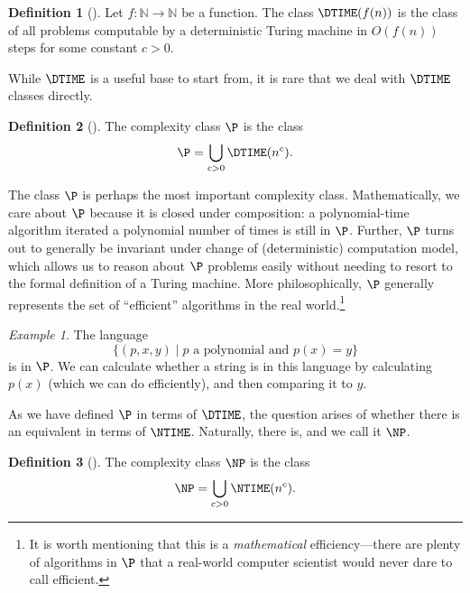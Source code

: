 \documentclass[english,12pt]{reedthesis}
\theoremstyle{plain}
\theoremstyle{definition}
\newtheorem{defn}[defn]{Definition}
\theoremstyle{remark}
\newtheorem{example}{Example}[thm]
\begin{document}
\begin{defn}[{\cite[Def.\ 1.19]{AB09}}]\label{def:dtime}
  Let $f: \mathbb{N} \rightarrow \mathbb{N}$ be a function. The class $\DTIME(f(n))$ is the class of all
  problems computable by a deterministic Turing machine in $O(f(n))$ steps for
  some constant $c > 0$.
\end{defn}

While $\DTIME$ is a useful base to start from, it is rare that we deal with
$\DTIME$ classes directly. %

\begin{defn}[{\cite[Def.\ 1.20]{AB09}}]\label{def:p}
  The complexity class $\P$ is the class
  \[
    \P = \bigcup_{c > 0}\DTIME(n^{c}).
  \]
\end{defn}

The class $\P$ is perhaps the most important complexity class. Mathematically,
we care about $\P$ because it is closed under composition: a polynomial-time
algorithm iterated a polynomial number of times is still in $\P$. Further, $\P$
turns out to generally be invariant under change of (deterministic) computation
model, which allows us to reason about $\P$ problems easily without needing to
resort to the formal definition of a Turing machine. More philosophically, $\P$
generally represents the set of ``efficient'' algorithms in the real
world.\footnote{It is worth mentioning that this is a \emph{mathematical}
  efficiency---there are plenty of algorithms in $\P$ that a real-world computer
  scientist would never dare to call efficient.}

\begin{example}\label{ex:polynomial-is-p}
  The language
  \[
    \{(p, x, y) \mid p \text{ a polynomial and } p(x) = y\}
  \]
  is in $\P$. We can calculate whether a string is in this language by
  calculating $p(x)$ (which we can do efficiently), and then comparing it to
  $y$.
\end{example}

As we have defined $\P$ in terms of $\DTIME$, the question arises of whether
there is an equivalent in terms of $\NTIME$. Naturally, there is, and we call it
$\NP$.

\begin{defn}[{\cite[Cor.\ 7.22]{Sip97}}]\label{def:np}
  The complexity class $\NP$ is the class
  \[
    \NP = \bigcup_{c > 0}\NTIME(n^{c}).
  \]
\end{defn}
\end{document}
